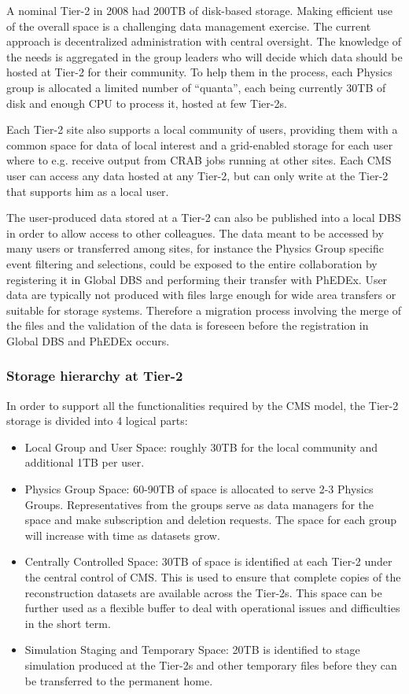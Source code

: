 A nominal Tier-2 in 2008 had 200TB of disk-based storage.
Making efficient use of the overall space is a challenging data management exercise.
The current approach is decentralized administration with central oversight.
The knowledge of the needs is aggregated in the group leaders who will decide which data should be hosted at Tier-2 for their community. To help
them in the process, each Physics group is allocated a limited number 
of ``quanta'', each being currently 30TB of disk and enough CPU to process it, hosted at few Tier-2s. 

Each Tier-2 site also supports a local community of users, providing them
with a common space for data of local interest and a grid-enabled
storage for each user where to e.g. receive output from CRAB jobs
running at other sites. Each CMS user can access any data
hosted at any Tier-2, but can only write at the Tier-2 that supports him
as a local user.

The user-produced data stored at a Tier-2 can also be published into a local DBS
in order to allow access to other colleagues.
The data meant to be accessed by many users or transferred among sites, for instance the Physics Group specific event filtering and selections,
could be exposed to the entire collaboration by registering it in Global DBS and performing their transfer with PhEDEx.
User data are typically not produced with files large enough for wide area transfers or suitable for storage systems. Therefore a migration process involving the merge of the files and the validation of the data is foreseen before the registration in Global DBS and PhEDEx occurs.
 
\subsubsection{Storage hierarchy at Tier-2}
In order to support all the functionalities required by the CMS model, the Tier-2 storage is divided into 4 logical parts:
\begin{itemize}
\item{} Local Group and User Space: roughly 30TB for the local community and additional 1TB per user.
\item{} Physics Group Space: 60-90TB of space is allocated to serve 2-3 Physics Groups. Representatives from the groups serve as data managers for the space and make subscription and deletion requests.
The space for each group will increase with time as datasets grow.
\item{} Centrally Controlled Space: 30TB of space is identified at each Tier-2 under the central control of CMS.
This is used to ensure that complete copies of the reconstruction datasets are available across the Tier-2s. This space can be further used as a flexible buffer to deal with operational issues and difficulties in the short term.
\item{} Simulation Staging and Temporary Space: 20TB is identified to
stage simulation produced at the Tier-2s and other temporary
files before they can be transferred to the permanent home. 
\end{itemize}

